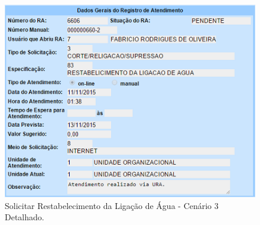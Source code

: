 \begin{anexosenv}
\begin{figure}[H]
	\centering
	\caption{Solicitar Restabelecimento da Ligação de Água - Cenário 3 Detalhado.}
	\includegraphics{figuras/anexo/restabelecer/detalhe_3.png}
\end{figure}


\end{anexosenv}



